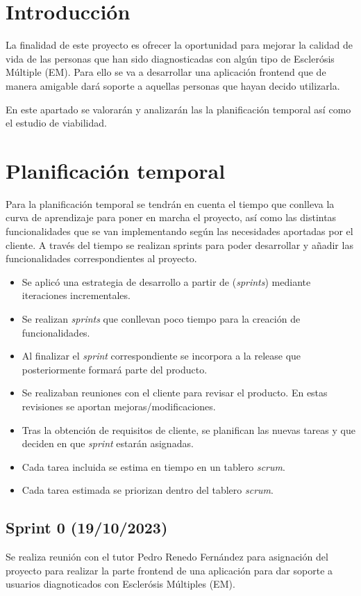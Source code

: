 
\section{Introducción}
La finalidad de este proyecto es ofrecer la oportunidad para mejorar la calidad de vida de las personas 
que han sido diagnosticadas con algún tipo de Esclerósis Múltiple (EM). Para ello se va a desarrollar una 
aplicación frontend que de manera amigable dará soporte a aquellas personas que hayan decido utilizarla.

En este apartado se valorarán y analizarán las la planificación temporal así como el estudio de viabilidad.

\section{Planificación temporal}
Para la planificación temporal se tendrán en cuenta el tiempo que conlleva la curva de aprendizaje para 
poner en marcha el proyecto, así como las distintas funcionalidades que se van implementando según las 
necesidades aportadas por el cliente.
A través del tiempo se realizan sprints para poder desarrollar y añadir las funcionalidades correspondientes al
proyecto.

\begin{itemize}
\tightlist
\item
Se aplicó una estrategia de desarrollo a partir de (\emph{sprints}) mediante iteraciones incrementales.
\item
Se realizan \emph{sprints} que conllevan poco tiempo para la creación de funcionalidades.
\item
Al finalizar el \emph{sprint} correspondiente se incorpora a la release que posteriormente formará parte del producto.
\item
Se realizaban reuniones con el cliente para revisar el producto. En estas revisiones se aportan mejoras/modificaciones.
\item
Tras la obtención de requisitos de cliente, se planifican las nuevas tareas y que deciden en que \emph{sprint} estarán asignadas.
\item
Cada tarea incluida se estima en tiempo en un tablero \emph{scrum}.
\item
Cada tarea estimada se priorizan dentro del tablero \emph{scrum}.
\end{itemize}

\subsection{Sprint 0 (19/10/2023)}
Se realiza reunión con el tutor Pedro Renedo Fernández para asignación del proyecto para realizar la parte frontend de una aplicación
para dar soporte a usuarios diagnoticados con Esclerósis Múltiples (EM).

